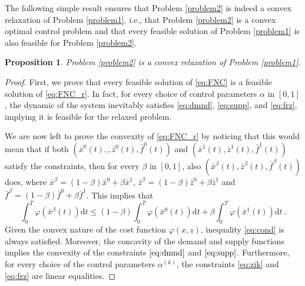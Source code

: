 \documentclass[preprint,12pt]{elsarticle}
\newtheorem{proposition}{Proposition}
\newcommand{\be}{\begin{equation}}
\newcommand{\ee}{\end{equation}}
\renewcommand{\d}{\text{d}}
\begin{document}
The following simple result ensures that  Problem \ref{problem2} is indeed a convex relaxation of Problem \ref{problem1}, i.e., that Problem \ref{problem2} is a convex optimal control problem and that every feasible solution of Problem \ref{problem1} is also feasible for Problem \ref{problem2}. 

\begin{proposition}
   Problem \ref{problem2} is a convex relaxation of Problem \ref{problem1}. 
\end{proposition}
\begin{proof}
	First, we prove that every feasible solution of \eqref{eq:FNC} is a feasible solution of \eqref{eq:FNC_r}. In fact, for every choice of control parameters $\alpha$ in $[0,1]$, the dynamic of the system inevitably satisfies  \eqref{eq:dmnd}, \eqref{eq:supp}, and \eqref{eq:frz}, implying it is feasible for the relaxed problem.
	
	We are now left to prove the convexity of \eqref{eq:FNC_r} by noticing that this would mean that if both 
	$\left( \bar x^0(t), \allowbreak,\bar z^0(t),\bar f^0(t)\right)$ and $\left( \bar x^1(t),\bar z^1(t),\bar f^1(t)\right)$ satisfy the constraints, then for every $\beta$ in $\left[0,1\right]$, also $\left( \bar x^\beta(t),\bar z^\beta(t),\bar f^\beta(t)\right)$ does, where $\bar x^\beta = (1-\beta)\bar x^0 + \beta \bar x^1$, $\bar z^\beta = (1-\beta)\bar z^0 + \beta \bar z^1$ and $\bar f^\beta = (1-\beta)\bar f^0 + \beta \bar f^1$. This implies that
	\be\label{eq:cond}
	\int_0^T{\varphi(\bar x^\beta(t)) \d t} \leq (1-\beta)\int_0^T{\varphi(\bar x^0(t))\d t} + \beta\int_0^T{\varphi(\bar x^1	(t))\d t} \,.
	\ee
	Given the convex nature of the cost function $\varphi(x,z)$, inequality \eqref{eq:cond} is always satisfied. Moreover, the concavity of the demand and supply functions implies the convexity of the constraints $\eqref{eq:dmnd}$ and $\eqref{eq:supp}$. Furthermore, for every choice of the control parameters $\alpha^{(k)}$, the constraints \eqref{eq:zik} and \eqref{eq:frz} are linear equalities.
\end{proof}
\end{document}
